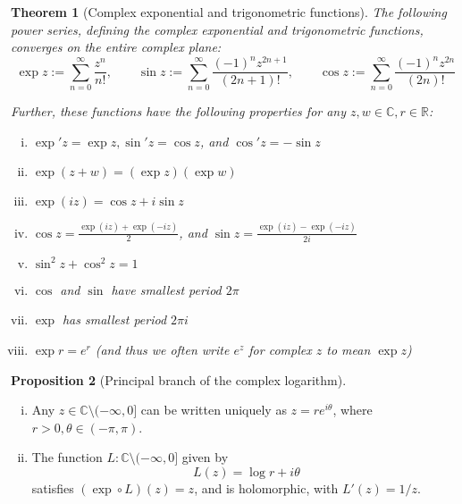 \documentclass[10pt,fleqn]{article}
\newcommand{\comps}{\mathbb{C}}
\newcommand{\reals}{\mathbb{R}}
\theoremstyle{definition} \newtheorem{defn}{Definition}[section]
\theoremstyle{plain}      \newtheorem{thm}[defn]{Theorem}
\theoremstyle{definition} \newtheorem{prop}[defn]{Proposition}
\theoremstyle{plain}      \newtheorem{lem}[defn]{Lemma}
\theoremstyle{definition} \newtheorem{cor}[defn]{Corollary}
\theoremstyle{definition} \newtheorem{ex}[defn]{Example}
\theoremstyle{definition} \newtheorem{rem}[defn]{Remark}
\begin{document}
\begin{thm}[Complex exponential and trigonometric functions]
    The following power series, defining the complex exponential and trigonometric functions, converges on the entire complex plane:
    \begin{equation}
        \exp z:=\sum_{n=0}^{\infty}\frac{z^n}{n!},\qquad
        \sin z:=\sum_{n=0}^{\infty}\frac{(-1)^nz^{2n+1}}{(2n+1)!},\qquad
        \cos z:=\sum_{n=0}^{\infty}\frac{(-1)^nz^{2n}}{(2n)!}
    \end{equation}

    Further, these functions have the following properties for any $z,w\in\comps,r\in\reals$:
    \begin{enumerate}[(i)]
        \item $\exp'z=\exp z,\sin'z=\cos z$, and $\cos'z=-\sin z$
        \item $\exp(z+w)=(\exp z)(\exp w)$
        \item $\exp(iz)=\cos z+i\sin z$
        \item $\cos z=\frac{\exp(iz)+\exp(-iz)}{2}$, and $\sin z=\frac{\exp(iz)-\exp(-iz)}{2i}$
        \item $\sin^2z+\cos^2z=1$
        \item $\cos$ and $\sin$ have smallest period $2\pi$
        \item $\exp$ has smallest period $2\pi i$
        \item $\exp r=e^r$ (and thus we often write $e^z$ for complex $z$ to mean $\exp z$)
    \end{enumerate}
\end{thm}

\begin{prop}[Principal branch of the complex logarithm]
    \begin{enumerate}[(i)]
        \item Any $z\in\comps\setminus(-\infty,0]$ can be written uniquely as $z=re^{i\theta}$, where $r>0,\theta\in(-\pi,\pi)$.
        \item The function $L:\comps\setminus(-\infty,0]$ given by
        \begin{equation}
            L(z)=\log r+i\theta
        \end{equation}
        satisfies $(\exp\circ L)(z)=z$, and is holomorphic, with $L'(z)=1/z$.
    \end{enumerate}
\end{prop}
\end{document}
